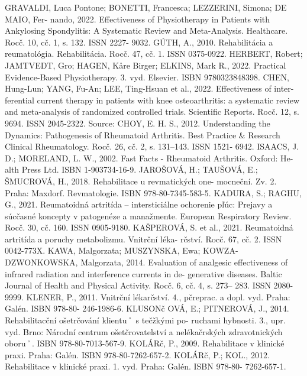 GRAVALDI, Luca Pontone; BONETTI, Francesca; LEZZERINI, Simona; DE MAIO, Fer-
nando, 2022. Effectiveness of Physiotherapy in Patients with Ankylosing Spondylitis:
A Systematic Review and Meta-Analysis. Healthcare. Rocč. 10, cč. 1, s. 132. ISSN 2227-
9032.
GÚTH, A., 2010. Rehabilitácia a reumatológia. Rehabilitácia. Rocč. 47, cč. 1. ISSN 0375-0922.
HERBERT, Robert; JAMTVEDT, Gro; HAGEN, Kåre Birger; ELKINS, Mark R., 2022.
Practical Evidence-Based Physiotherapy. 3. vyd. Elsevier. ISBN 9780323848398.
CHEN, Hung-Lun; YANG, Fu-An; LEE, Ting-Hsuan et al., 2022. Effectiveness of inter-
ferential current therapy in patients with knee osteoarthritis: a systematic review and
meta-analysis of randomized controlled trials. Scientific Reports. Rocč. 12, s. 9694. ISSN
2045-2322. Source:
CHOY, E. H. S., 2012. Understanding the Dynamics: Pathogenesis of Rheumatoid Arthritis.
Best Practice & Research Clinical Rheumatology. Rocč. 26, cč. 2, s. 131–143. ISSN 1521-
6942.
ISAACS, J. D.; MORELAND, L. W., 2002. Fast Facts - Rheumatoid Arthritis. Oxford: He-
alth Press Ltd. ISBN 1-903734-16-9.
JAROŠOVÁ, H.; TAUŠOVÁ, E.; ŠMUCROVÁ, H., 2018. Rehabilitace u revmatických one-
mocneční. Zv. 2. Praha: Maxdorf. Revmatologie. ISBN 978-80-7345-583-5.
KADURA, S.; RAGHU, G., 2021. Reumatoidná artritída – intersticiálne ochorenie pľúc:
Prejavy a súcčasné koncepty v patogenéze a manažmente. European Respiratory Review.
Rocč. 30, cč. 160. ISSN 0905-9180.
KAŠPEROVÁ, S. et al., 2021. Reumatoidná artritída a poruchy metabolizmu. Vnitrční léka-
rčství. Rocč. 67, cč. 2. ISSN 0042-773X.
KAWA, Malgorzata; MUSZYNSKA, Ewa; KOWZA-DZWONKOWSKA, Malgorzata, 2014.
Evaluation of analgesic effectiveness of infrared radiation and interference currents in de-
generative diseases. Baltic Journal of Health and Physical Activity. Rocč. 6, cč. 4, s. 273–
283. ISSN 2080-9999.
KLENER, P., 2011. Vnitrční lékarčství. 4., pčreprac. a dopl. vyd. Praha: Galén. ISBN 978-80-
246-1986-6.
KLUSONč OVÁ, E.; PITNEROVÁ, J., 2014. Rehabilitacční ošetrčování klientu˚ s tečžkými po-
ruchami hybnosti. 3., upr. vyd. Brno: Národní centrum ošetčrovatelství a nelékačrských
zdravotnických oboru˚. ISBN 978-80-7013-567-9.
KOLÁRč, P., 2009. Rehabilitace v klinické praxi. Praha: Galén. ISBN 978-80-7262-657-2.
KOLÁRč, P.; KOL., 2012. Rehabilitace v klinické praxi. 1. vyd. Praha: Galén. ISBN 978-80-
7262-657-1.


